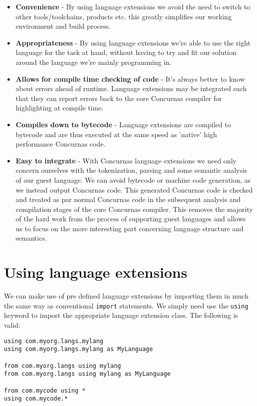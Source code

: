\documentclass[conc-doc]{subfiles}
\begin{document}
\begin{itemize}
	\item \textbf{Convenience} - By using language extensions we avoid the need to switch to other tools/toolchains, products etc. this greatly simplifies our working environment and build process.
	\item \textbf{Appropriateness} - By using language extensions we're able to use the right language for the task at hand, without having to try and fit our solution around the language we're mainly programming in.
	\item \textbf{Allows for compile time checking of code} - It's always better to know about errors ahead of runtime. Language extensions may be integrated such that they can report errors back to the core Concurnas compiler for highlighting at compile time. 
	\item \textbf{Compiles down to bytecode} - Language extensions are compiled to bytecode and are thus executed at the same speed as 'native' high performance Concurnas code.
	\item \textbf{Easy to integrate} - With Concurnas language extensions we need only concern ourselves with the tokenization, parsing and some semantic analysis of our guest language. We can avoid bytecode or machine code generation, as we instead output Concurnas code. This generated Concurnas code is checked and treated as par normal Concurnas code in the subsequent analysis and compilation stages of the core Concurnas compiler. This removes the majority of the hard work from the process of supporting guest languages and allows us to focus on the more interesting part concerning language structure and semantics.
\end{itemize}


\section{Using language extensions}
We can make use of pre defined language extensions by importing them in much the same way as conventional \lstinline{import} statements. We simply need use the \lstinline{using} keyword to import the appropriate language extension class. The following is valid:

\begin{lstlisting}
using com.myorg.langs.mylang
using com.myorg.langs.mylang as MyLanguage

from com.myorg.langs using mylang
from com.myorg.langs using mylang as MyLanguage

from com.mycode using *
using com.mycode.*
\end{lstlisting}
\end{document}
